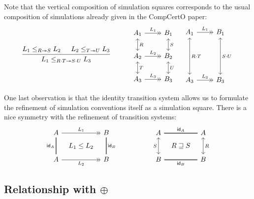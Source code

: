 \documentclass{article}
\begin{document}
Note that the vertical composition of simulation squares
corresponds to the usual composition of simulations already given
in the CompCertO paper:
\[
  \begin{prooftree}
    \hypo{L_1 \le_{R \twoheadrightarrow S} L_2}
    \hypo{L_2 \le_{T \twoheadrightarrow U} L_3}
    \infer2{L_1 \le_{R \cdot T \twoheadrightarrow S \cdot U} L_3}
  \end{prooftree}
  \hspace{3em}
  \begin{tikzcd}
    A_1 \ar[r, ->>, "L_1"] \ar[d, <->, "R"] & B_1 \ar[d, <->, "S"] \\
    A_2 \ar[r, ->>, "L_2"] \ar[d, <->, "T"] & B_2 \ar[d, <->, "U"] \\
    A_3 \ar[r, ->>, "L_3"] & B_3
  \end{tikzcd}
  \quad
  \begin{tikzcd}[row sep=large]
    A_1 \ar[r, ->>, "L_1"] \ar[dd, <->, "R \cdot T"] & B_1 \ar[dd, <->, "S \cdot U"] \\ \\
    A_3 \ar[r, ->>, "L_3"] & B_3
  \end{tikzcd}
\]

One last observation is that the identity transition system
allows us to formulate the refinement of simulation conventions itself
as a simulation square.
There is a nice symmetry
with the refinement of transition systems:
\[
  \begin{tikzcd}[sep=tiny]
    A \ar[dd, double, dash, "\mathsf{id}_A"'] \ar[rr, ->>, "L_1"] &&
    B \ar[dd, double, dash, "\mathsf{id}_B"] \\
    & L_1 \le L_2 & \\
    A \ar[rr, ->>, "L_2"'] &&
    B
  \end{tikzcd}
  \hspace{5em}
  \begin{tikzcd}[sep=tiny]
    A \ar[dd, <->, "S"'] \ar[rr, double, dash, "\mathsf{id}_A"] &&
    A \ar[dd, <->, "R"] \\
    & R \sqsupseteq S & \\
    B \ar[rr, double, dash, "\mathsf{id}_B"'] &&
    B
  \end{tikzcd}
\]


\subsection{Relationship with $\oplus$} %
\end{document}
